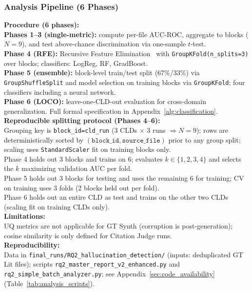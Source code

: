 \subsubsection{Analysis Pipeline (6 Phases)}
\label{sec:rq2_analysis}

\noindent\textbf{Procedure (6 phases):}\\
\textbf{Phases 1--3 (single-metric):} compute per-file AUC-ROC, aggregate to blocks ($N{=}9$), and test above-chance discrimination via one-sample $t$-test.\\
\textbf{Phase 4 (RFE):} Recursive Feature Elimination~\cite{pedregosa2011sklearn} with \texttt{GroupKFold(n\_splits=3)} over blocks; classifiers: LogReg, RF, GradBoost.\\
\textbf{Phase 5 (ensemble):} block-level train/test split (67\%/33\%) via \texttt{GroupShuffleSplit} and model selection on training blocks via \texttt{GroupKFold}; four classifiers including a neural network.\\
\textbf{Phase 6 (LOCO):} leave-one-CLD-out evaluation for cross-domain generalization. Full formal specification in Appendix~\ref{alg:classification}.\\
\textbf{Reproducible splitting protocol (Phases 4--6):}\\
Grouping key is \texttt{block\_id=cld\_run} (3 CLDs $\times$ 3 runs $\Rightarrow N{=}9$); rows are deterministically sorted by \((\texttt{block\_id}, \texttt{source\_file})\) prior to any group split; scaling uses \texttt{StandardScaler} fit on training blocks only.\\
Phase 4 holds out 3 blocks and trains on 6; evaluates \(k \in \{1,2,3,4\}\) and selects the \(k\) maximizing validation AUC per fold.\\
Phase 5 holds out 3 blocks for testing and uses the remaining 6 for training; CV on training uses 3 folds (2 blocks held out per fold).\\
Phase 6 holds out an entire CLD as test and trains on the other two CLDs (scaling fit on training CLDs only).\\
\textbf{Limitations:}\\
UQ metrics are not applicable for GT Synth (corruption is post-generation); cosine similarity is only defined for Citation Judge runs.\\
\textbf{Reproducibility:}\\
Data in \texttt{final\_runs/RQ2\_hallucination\_detection/} (inputs: deduplicated GT Lit files); scripts \texttt{rq2\_master\_report\_v2\_enhanced.py} and \texttt{rq2\_simple\_batch\_analyzer.py}; see Appendix~\ref{sec:code_availability} (Table~\ref{tab:analysis_scripts}).
    
